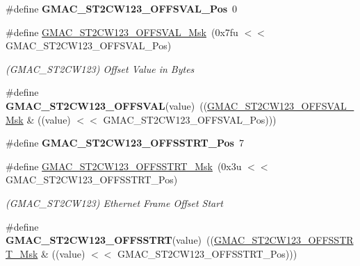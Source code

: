 \begin{DoxyCompactItemize}
\item 
\mbox{\label{group__SAME70__GMAC_gab6656e92daf596babd97809e8d118ba3}} 
\#define {\bfseries G\+M\+A\+C\+\_\+\+S\+T2\+C\+W123\+\_\+\+O\+F\+F\+S\+V\+A\+L\+\_\+\+Pos}~0
\item 
\mbox{\label{group__SAME70__GMAC_ga47db9c881422e72dfc060622dbdac7e2}} 
\#define \mbox{\hyperlink{group__SAME70__GMAC_ga47db9c881422e72dfc060622dbdac7e2}{G\+M\+A\+C\+\_\+\+S\+T2\+C\+W123\+\_\+\+O\+F\+F\+S\+V\+A\+L\+\_\+\+Msk}}~(0x7fu $<$$<$ G\+M\+A\+C\+\_\+\+S\+T2\+C\+W123\+\_\+\+O\+F\+F\+S\+V\+A\+L\+\_\+\+Pos)
\begin{DoxyCompactList}\small\item\em (G\+M\+A\+C\+\_\+\+S\+T2\+C\+W123) Offset Value in Bytes \end{DoxyCompactList}\item 
\mbox{\label{group__SAME70__GMAC_ga6072fb94007a767f9c66cc874df4a4e1}} 
\#define {\bfseries G\+M\+A\+C\+\_\+\+S\+T2\+C\+W123\+\_\+\+O\+F\+F\+S\+V\+AL}(value)~((\mbox{\hyperlink{group__SAMV71__GMAC_ga47db9c881422e72dfc060622dbdac7e2}{G\+M\+A\+C\+\_\+\+S\+T2\+C\+W123\+\_\+\+O\+F\+F\+S\+V\+A\+L\+\_\+\+Msk}} \& ((value) $<$$<$ G\+M\+A\+C\+\_\+\+S\+T2\+C\+W123\+\_\+\+O\+F\+F\+S\+V\+A\+L\+\_\+\+Pos)))
\item 
\mbox{\label{group__SAME70__GMAC_ga736b88e34cc5308ce868655f193adc08}} 
\#define {\bfseries G\+M\+A\+C\+\_\+\+S\+T2\+C\+W123\+\_\+\+O\+F\+F\+S\+S\+T\+R\+T\+\_\+\+Pos}~7
\item 
\mbox{\label{group__SAME70__GMAC_gafe459e560a300a977172a99bedf8fb45}} 
\#define \mbox{\hyperlink{group__SAME70__GMAC_gafe459e560a300a977172a99bedf8fb45}{G\+M\+A\+C\+\_\+\+S\+T2\+C\+W123\+\_\+\+O\+F\+F\+S\+S\+T\+R\+T\+\_\+\+Msk}}~(0x3u $<$$<$ G\+M\+A\+C\+\_\+\+S\+T2\+C\+W123\+\_\+\+O\+F\+F\+S\+S\+T\+R\+T\+\_\+\+Pos)
\begin{DoxyCompactList}\small\item\em (G\+M\+A\+C\+\_\+\+S\+T2\+C\+W123) Ethernet Frame Offset Start \end{DoxyCompactList}\item 
\mbox{\label{group__SAME70__GMAC_ga213539f942f8015b57ebffbc4cca0e52}} 
\#define {\bfseries G\+M\+A\+C\+\_\+\+S\+T2\+C\+W123\+\_\+\+O\+F\+F\+S\+S\+T\+RT}(value)~((\mbox{\hyperlink{group__SAMV71__GMAC_gafe459e560a300a977172a99bedf8fb45}{G\+M\+A\+C\+\_\+\+S\+T2\+C\+W123\+\_\+\+O\+F\+F\+S\+S\+T\+R\+T\+\_\+\+Msk}} \& ((value) $<$$<$ G\+M\+A\+C\+\_\+\+S\+T2\+C\+W123\+\_\+\+O\+F\+F\+S\+S\+T\+R\+T\+\_\+\+Pos)))

\end{DoxyCompactItemize}
